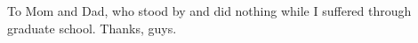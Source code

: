 \thispagestyle{empty}
\newenvironment{dedication}
  {\cleardoublepage \thispagestyle{empty} \vspace*{\stretch{1}} \begin{center} \em}
  {\end{center} \vspace*{\stretch{3}} \clearpage}
\begin{dedication}

\Large To Mom and Dad, who stood by and did nothing while I suffered through graduate school. Thanks, guys. 

\end{dedication}
